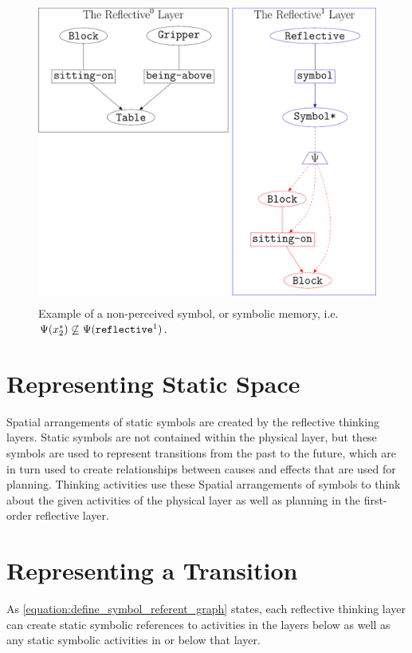 \begin{figure}
\center
\includegraphics[height=10cm]{gfx/example_symbolic_memory}
\caption{Example of a non-perceived symbol, or symbolic memory,
  i.e. $\Psi(x_2^*)\not\subseteq\Psi(\text{\tt{reflective}}^1)$.}
\label{figure:example_symbolic_memory}
\end{figure}

\section{Representing Static Space}

Spatial arrangements of static symbols are created by the reflective
thinking layers.  Static symbols are not contained within the physical
layer, but these symbols are used to represent transitions from the
past to the future, which are in turn used to create relationships
between causes and effects that are used for planning.  Thinking
activities use these Spatial arrangements of symbols to think about
the given activities of the physical layer as well as planning in the
first-order reflective layer.

\section{Representing a Transition}

As {\mbox{\autoref{equation:define_symbol_referent_graph}}} states,
each reflective thinking layer can create static symbolic references
to activities in the layers below as well as any static symbolic
activities in or below that layer.

